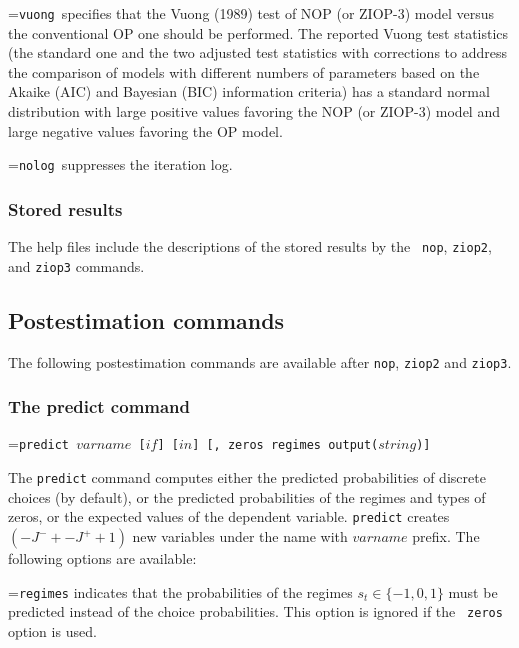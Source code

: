 \documentclass[letterpaper,fleqn,12pt]{article}
\begin{document}
\smallskip

\hangindent=\parindent\noindent \texttt{vuong }specifies that the Vuong
(1989) test of NOP (or ZIOP-3) model versus the conventional OP one should
be performed. The reported Vuong test statistics (the standard one and the
two adjusted test statistics with corrections to address the comparison of
models with different numbers of parameters based on the Akaike (AIC) and
Bayesian (BIC) information criteria) has a standard normal distribution with
large positive values favoring the NOP (or ZIOP-3) model and large negative
values favoring the OP model.

\smallskip

\hangindent=\parindent\noindent \texttt{nolog }suppresses the iteration log.

\subsubsection*{Stored results}

The help files include the descriptions of the stored results by the \texttt{%
nop}, \texttt{ziop2}, and \texttt{ziop3} commands.

\subsection{Postestimation commands}

The following postestimation commands are available after \texttt{nop}, 
\texttt{ziop2} and \texttt{ziop3}.

\subsubsection*{The predict command}

\hangindent=\parindent\noindent \texttt{predict $varname$ [$if$] [$in$] [,
zeros regimes output($string$)]}

\smallskip 

The \texttt{predict} command computes either the predicted probabilities of
discrete choices (by default), or the predicted probabilities of the regimes
and types of zeros, or the expected values of the dependent variable. 
\texttt{predict} creates $(-J^{-}+-J^{+}+1)$ new variables under the name
with \texttt{$varname$} prefix. The following options are available:

\smallskip 

\smallskip \hangindent=\parindent\noindent \texttt{regimes} indicates that
the probabilities of the regimes $s_{t}\in \{-1,0,1\}$ must be predicted
instead of the choice probabilities. This option is ignored if the \texttt{%
zeros} option is used.
\end{document}
